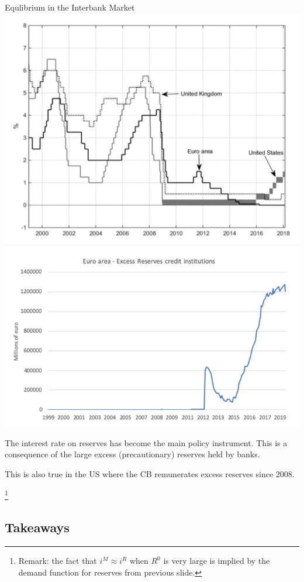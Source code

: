 \documentclass[
  ignorenonframetext,
  aspectratio=169,
]{beamer}
\begin{document}
\begin{frame}{Equlibrium in the Interbank Market}
\includegraphics{short_term.png} \includegraphics{excess_reserves.png}

The interest rate on reserves has become the main policy instrument.
This is a consequence of the large excess (precautionary) reserves held
by banks.

This is also true in the US where the CB remunerates excess reserves
since 2008.

\footnote{Remark: the fact that $i^M\approx i^R$ when $R^0$ is very large is implied by the demand function for reserves from previous slide.}
\end{frame}

\subsection{Takeaways}\label{takeaways}
\end{document}
